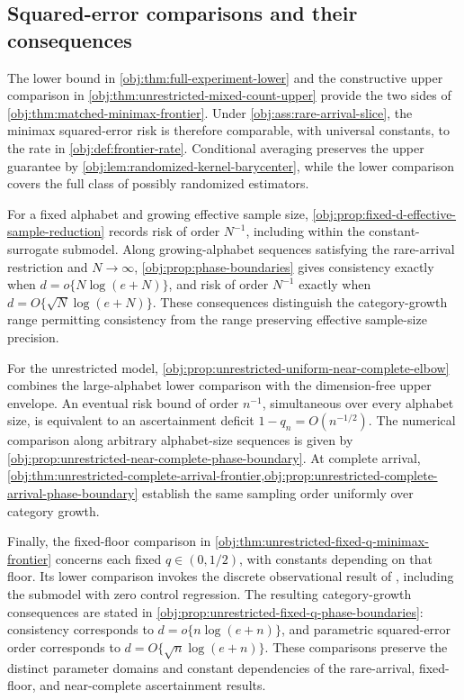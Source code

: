 \subsection{Squared-error comparisons and their consequences}

The lower bound in \cref{obj:thm:full-experiment-lower} and the constructive upper comparison in \cref{obj:thm:unrestricted-mixed-count-upper} provide the two sides of \cref{obj:thm:matched-minimax-frontier}. Under \cref{obj:ass:rare-arrival-slice}, the minimax squared-error risk is therefore comparable, with universal constants, to the rate in \cref{obj:def:frontier-rate}. Conditional averaging preserves the upper guarantee by \cref{obj:lem:randomized-kernel-barycenter}, while the lower comparison covers the full class of possibly randomized estimators.

For a fixed alphabet and growing effective sample size, \cref{obj:prop:fixed-d-effective-sample-reduction} records risk of order \(N^{-1}\), including within the constant-surrogate submodel. Along growing-alphabet sequences satisfying the rare-arrival restriction and \(N\to\infty\), \cref{obj:prop:phase-boundaries} gives consistency exactly when \(d=o\{N\log(e+N)\}\), and risk of order \(N^{-1}\) exactly when \(d=O\{\sqrt N\log(e+N)\}\). These consequences distinguish the category-growth range permitting consistency from the range preserving effective sample-size precision.

For the unrestricted model, \cref{obj:prop:unrestricted-uniform-near-complete-elbow} combines the large-alphabet lower comparison with the dimension-free upper envelope. An eventual risk bound of order \(n^{-1}\), simultaneous over every alphabet size, is equivalent to an ascertainment deficit \(1-q_n=O(n^{-1/2})\). The numerical comparison along arbitrary alphabet-size sequences is given by \cref{obj:prop:unrestricted-near-complete-phase-boundary}. At complete arrival, \cref{obj:thm:unrestricted-complete-arrival-frontier,obj:prop:unrestricted-complete-arrival-phase-boundary} establish the same sampling order uniformly over category growth.

Finally, the fixed-floor comparison in \cref{obj:thm:unrestricted-fixed-q-minimax-frontier} concerns each fixed \(q\in(0,1/2)\), with constants depending on that floor. Its lower comparison invokes the discrete observational result of \citet[Theorem~2, Section~3.2, p.~9, and its proof in Section~C.5, pp.~39--44]{ZengBalakrishnanHanKennedy2026}, including the submodel with zero control regression. The resulting category-growth consequences are stated in \cref{obj:prop:unrestricted-fixed-q-phase-boundaries}: consistency corresponds to \(d=o\{n\log(e+n)\}\), and parametric squared-error order corresponds to \(d=O\{\sqrt n\log(e+n)\}\). These comparisons preserve the distinct parameter domains and constant dependencies of the rare-arrival, fixed-floor, and near-complete ascertainment results.
